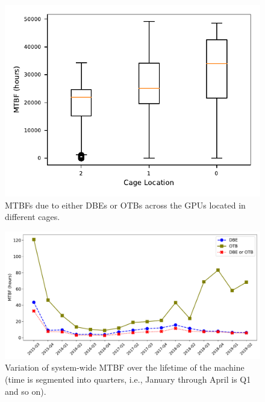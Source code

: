 \begin{figure}[bt]
  \begin{center}
    \includegraphics[width=\columnwidth]{figs/MTBF_CageWise.pdf}
  \end{center}
  \caption{MTBFs due to either DBEs or OTBs across the GPUs located in different cages.}
  \label{fig:CageWise_MTBFs}
\end{figure}


\begin{figure}[bt]
  \begin{center}
    \includegraphics[width=\columnwidth]{figs/MTBF_quaterly_sys.pdf}
  \end{center}
  \caption{Variation of system-wide MTBF over the lifetime of the machine (time is segmented into quarters, 
i.e., January through April is Q1 and so on).}
  \label{fig:MTBF_sys}
\end{figure}

